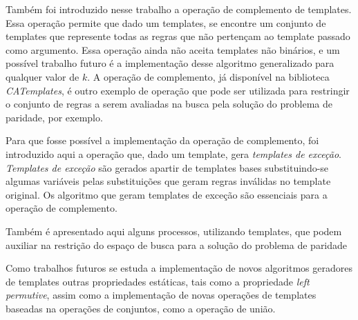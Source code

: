\documentclass[12pt,a4paper]{article}
\begin{document}
Também foi introduzido nesse trabalho a operação de complemento de templates. Essa operação permite que dado um templates, se encontre um conjunto de templates que represente todas as regras que não pertençam ao template passado como argumento. Essa operação ainda não aceita templates não binários, e um possível trabalho futuro é a implementação desse algoritmo generalizado para qualquer valor de $k$. A operação de complemento, já disponível na biblioteca \textit{CATemplates}, é outro exemplo de operação que pode ser utilizada para restringir o conjunto de regras a serem avaliadas na busca pela solução do problema de paridade, por exemplo.

Para que fosse possível a implementação da operação de complemento, foi introduzido aqui a operação que, dado um template, gera \textit{templates de exceção}. \textit{Templates de exceção} são gerados apartir de templates bases substituindo-se algumas variáveis pelas substituições que geram regras inválidas no template original. Os algoritmo que geram templates de exceção são essenciais para a operação de complemento.

Também é apresentado aqui alguns processos, utilizando templates, que podem auxiliar na restrição do espaço de busca para a solução do problema de paridade

Como trabalhos futuros se estuda a implementação de novos algoritmos geradores de templates outras propriedades estáticas, tais como a propriedade \textit{left permutive}, assim como a implementação de novas operações de templates baseadas na operações de conjuntos, como a operação de união.

 \def\refname{REFERÊNCIAS BIBLIOGRÁFICAS}
 
 
\end{document}
